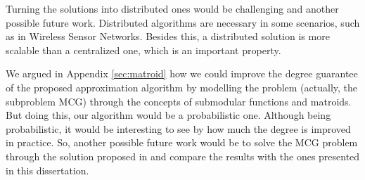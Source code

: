 Turning the solutions into distributed ones would be challenging and another possible future work. 
Distributed algorithms are necessary in some scenarios, such as in Wireless Sensor Networks. Besides this, a distributed solution 
is more scalable than a centralized one, which is an important property.

We argued in Appendix \ref{sec:matroid} how we could improve the degree guarantee of the proposed approximation algorithm by modelling the problem 
(actually, the subproblem MCG) through the concepts of submodular functions and matroids. But doing this, our algorithm would be a probabilistic one. Although being probabilistic, 
it would be interesting to see by how much the degree is improved in practice. So, another possible future work would be to solve the MCG problem 
through the solution proposed in \cite{Calinescu2011} and compare the results with the ones presented in this dissertation.

